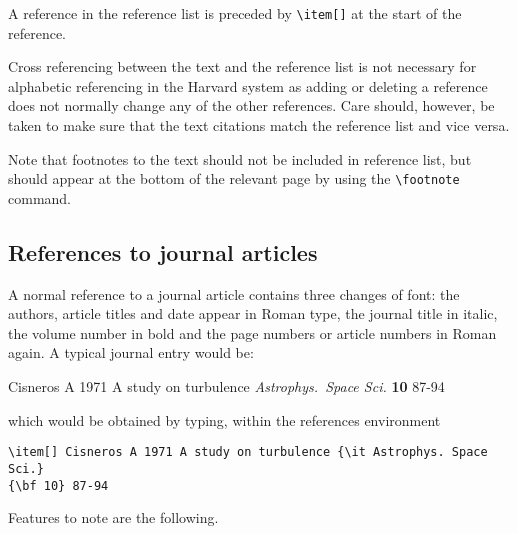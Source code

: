 \documentclass[12pt]{iopart}
\begin{document}
A reference in the reference list is preceded by \verb"\item[]" at the start of the reference.

Cross referencing between the text and the 
reference list is not necessary for alphabetic referencing 
in the Harvard system as adding or deleting a reference 
does not normally change any of the other references. 
Care should, however, be taken to make sure that the text citations match the reference list and vice versa.

Note that footnotes to the text should not be 
included in reference list, but should appear at the bottom of the relevant page by using the \verb"\footnote" command.
   
\subsection{References to journal articles}
A normal reference to a journal article contains three changes of 
font:
the authors, article titles and date appear in Roman type, the journal title in 
italic, the volume number in bold and the page numbers or article numbers in Roman again. 
A typical journal entry would be:

\smallskip
\begin{harvard}
\item[] Cisneros A 1971 A study on turbulence {\it Astrophys.\ Space Sci.} {\bf 10} 87-94
\end{harvard}
\smallskip

\noindent which would be obtained by typing, within the references
environment 
\small\begin{verbatim}
\item[] Cisneros A 1971 A study on turbulence {\it Astrophys. Space Sci.} 
{\bf 10} 87-94
\end{verbatim}\normalsize

Features to note are the following.
\end{document}
